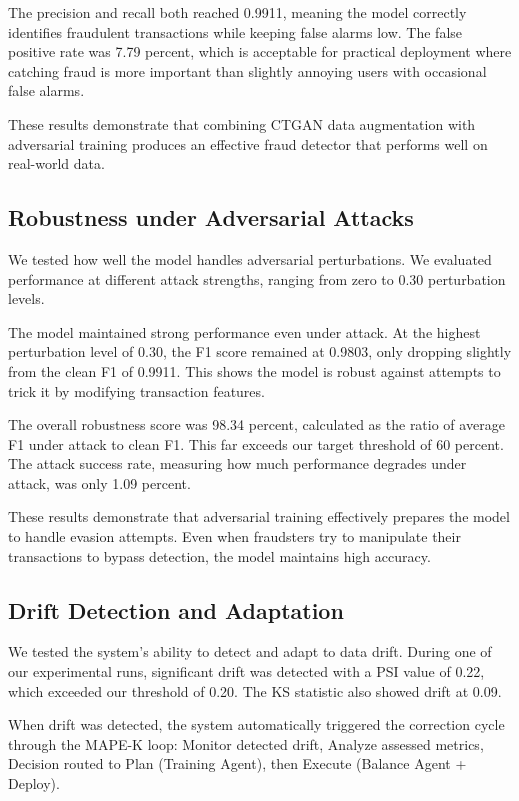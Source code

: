 \documentclass{svproc}
\begin{document}
The precision and recall both reached 0.9911, meaning the model correctly identifies fraudulent transactions while keeping false alarms low. The false positive rate was 7.79 percent, which is acceptable for practical deployment where catching fraud is more important than slightly annoying users with occasional false alarms.

These results demonstrate that combining CTGAN data augmentation with adversarial training produces an effective fraud detector that performs well on real-world data.

\subsection{Robustness under Adversarial Attacks}
We tested how well the model handles adversarial perturbations. We evaluated performance at different attack strengths, ranging from zero to 0.30 perturbation levels.

The model maintained strong performance even under attack. At the highest perturbation level of 0.30, the F1 score remained at 0.9803, only dropping slightly from the clean F1 of 0.9911. This shows the model is robust against attempts to trick it by modifying transaction features.

The overall robustness score was 98.34 percent, calculated as the ratio of average F1 under attack to clean F1. This far exceeds our target threshold of 60 percent. The attack success rate, measuring how much performance degrades under attack, was only 1.09 percent.

These results demonstrate that adversarial training effectively prepares the model to handle evasion attempts. Even when fraudsters try to manipulate their transactions to bypass detection, the model maintains high accuracy.

\subsection{Drift Detection and Adaptation}
We tested the system's ability to detect and adapt to data drift. During one of our experimental runs, significant drift was detected with a PSI value of 0.22, which exceeded our threshold of 0.20. The KS statistic also showed drift at 0.09.

When drift was detected, the system automatically triggered the correction cycle through the MAPE-K loop: Monitor detected drift, Analyze assessed metrics, Decision routed to Plan (Training Agent), then Execute (Balance Agent + Deploy).
\end{document}
